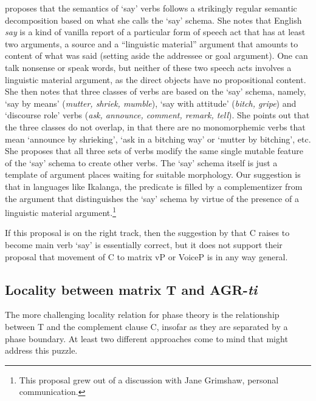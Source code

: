 \documentclass[output=paper,
modfonts
]{langscibook}
\begin{document}
\citet{Grimshaw2015} proposes that the semantics of  `say' verbs follows a strikingly regular semantic decomposition based on what she calls the `say' schema. She notes that English \textit{say} is a kind of vanilla report of a particular form of speech act that has at least two arguments, a source and a ``linguistic material'' argument that amounts to content of what was said (setting aside the addressee or goal argument). One can talk nonsense or speak words, but neither of these two speech acts involves a linguistic material argument, as the direct objects have no propositional content. She then notes that three classes of verbs are based on the `say' schema, namely, `say by means' (\textit{mutter, shriek, mumble}), `say with attitude' (\textit{bitch, gripe}) and `discourse role' verbs (\textit{ask, announce, comment, remark, tell}). She points out that the three classes do not overlap, in that there are no monomorphemic verbs that mean `announce by shrieking', `ask in a bitching way' or `mutter by bitching', etc. She proposes that all three sets of verbs modify the same single mutable feature of the `say' schema to create other verbs. The `say' schema itself is just a template of argument places waiting for suitable morphology. Our suggestion is that in languages like Ikalanga, the predicate is filled by a complementizer from the argument that distinguishes the `say' schema by virtue of the presence of a linguistic material argument.\footnote{This proposal grew out of a discussion with Jane Grimshaw, personal communication.}

If this proposal is on the right track, then the suggestion by \citeauthor{Diercks2017a} that C raises to become main verb `say' is essentially correct, but it does not support their proposal that movement of C to matrix vP or VoiceP is in any way general.

 

\subsection{Locality between matrix T and AGR-\textit{ti}}\label{letsholo:s3.5}\largerpage[-1]

The more challenging locality relation for phase theory is the relationship between T and the complement clause C, insofar as they are separated by a phase boundary. At least two different approaches come to mind that might address this puzzle.
\end{document}
